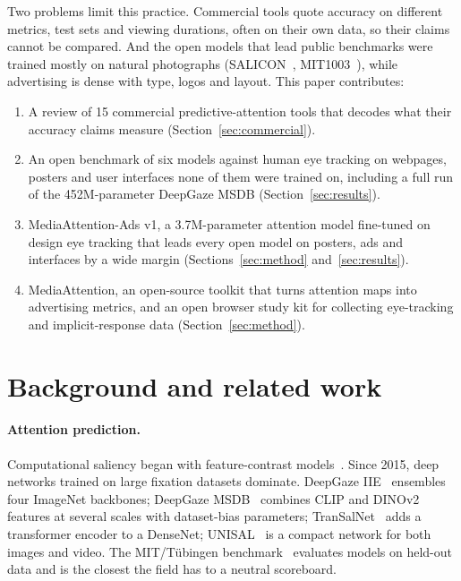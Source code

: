 \documentclass[11pt]{article}
\begin{document}
Two problems limit this practice. Commercial tools quote accuracy on different metrics, test sets and viewing durations,
often on their own data, so their claims cannot be compared. And the open models that lead public benchmarks were
trained mostly on natural photographs (SALICON~\cite{jiang2015salicon}, MIT1003~\cite{judd2009learning}), while
advertising is dense with type, logos and layout. This paper contributes:
\begin{enumerate}
\item A review of 15 commercial predictive-attention tools that decodes what their accuracy claims measure (Section~\ref{sec:commercial}).
\item An open benchmark of six models against human eye tracking on webpages, posters and user interfaces none of them
were trained on, including a full run of the 452M-parameter DeepGaze MSDB (Section~\ref{sec:results}).
\item MediaAttention-Ads v1, a 3.7M-parameter attention model fine-tuned on design eye tracking that leads every open
model on posters, ads and interfaces by a wide margin (Sections~\ref{sec:method} and~\ref{sec:results}).
\item MediaAttention, an open-source toolkit that turns attention maps into advertising metrics, and an open browser
study kit for collecting eye-tracking and implicit-response data (Section~\ref{sec:method}).
\end{enumerate}

\section{Background and related work}
\paragraph{Attention prediction.} Computational saliency began with feature-contrast models~\cite{itti1998model}. Since
2015, deep networks trained on large fixation datasets dominate. DeepGaze IIE~\cite{linardos2021deepgaze} ensembles
four ImageNet backbones; DeepGaze MSDB~\cite{kummerer2025msdb} combines CLIP and DINOv2 features at several scales with
dataset-bias parameters; TranSalNet~\cite{lou2022transalnet} adds a transformer encoder to a DenseNet; UNISAL~\cite{droste2020unisal}
is a compact network for both images and video. The MIT/T\"ubingen benchmark~\cite{kummerer2018benchmarking,mit300}
evaluates models on held-out data and is the closest the field has to a neutral scoreboard.
\end{document}
